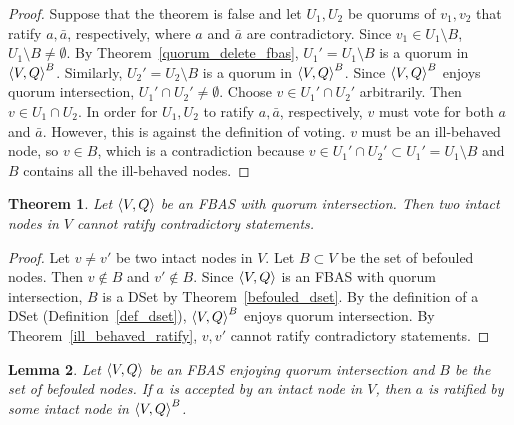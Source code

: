 \documentclass[12pt, psamsfonts]{amsart}
\newtheorem{thm}{Theorem}[subsection]
\newtheorem{lem}[thm]{Lemma}
\theoremstyle{definition}
\theoremstyle{remark}
\numberwithin{equation}{subsection}
\begin{document}
\begin{proof}
    Suppose that the theorem is false and let $U_1, U_2$ be quorums of $v_1, v_2$ that ratify $a, \bar{a}$, respectively, where $a$ and $\bar{a}$ are contradictory.
    Since $v_1 \in U_1 \setminus B$,  $U_1 \setminus B \ne \emptyset$.
    By Theorem~\ref{quorum_delete_fbas}, $U_1' = U_1 \setminus B$ is a quorum in $\ev{V, Q}^B$.
    Similarly, $U_2' = U_2 \setminus B$ is a quorum in $\ev{V, Q}^B$.
    Since $\ev{V, Q}^B$ enjoys quorum intersection, $U_1' \cap U_2' \ne \emptyset$.
    Choose $v \in U_1' \cap U_2'$ arbitrarily.
    Then $v \in U_1 \cap U_2$.
    In order for $U_1, U_2$ to ratify $a, \bar{a}$, respectively, $v$ must vote for both $a$ and $\bar{a}$.
    However, this is against the definition of voting.
    $v$ must be an ill-behaved node, so $v \in B$, which is a contradiction because $v \in U_1' \cap U_2' \subset U_1' = U_1 \setminus B$ and $B$ contains all the ill-behaved nodes.
\end{proof}

\begin{thm}\label{intact_ratify_contradictory}
    Let $\ev{V, Q}$ be an FBAS with quorum intersection.
    Then two intact nodes in $V$ cannot ratify contradictory statements.
\end{thm}

\begin{proof}
    Let $v \ne v'$ be two intact nodes in $V$.
    Let $B \subset V$ be the set of befouled nodes.
    Then $v \notin B$ and $v' \notin B$.
    Since $\ev{V, Q}$ is an FBAS with quorum intersection, $B$ is a DSet by Theorem~\ref{befouled_dset}.
    By the definition of a DSet (Definition~\ref{def_dset}), $\ev{V, Q}^B$ enjoys quorum intersection.
    By Theorem~\ref{ill_behaved_ratify}, $v, v'$ cannot ratify contradictory statements.
\end{proof}

\begin{lem}\label{lem_intact_ratify}
    Let $\ev{V, Q}$ be an FBAS enjoying quorum intersection and $B$ be the set of befouled nodes.
    If $a$ is accepted by an intact node in $V$, then $a$ is ratified by some intact node in $\ev{V, Q}^B$.
\end{lem}
\end{document}
